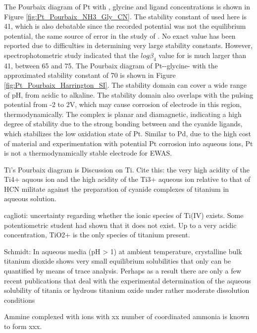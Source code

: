 \documentclass[journal=jacsat,manuscript=article]{achemso}
\begin{document}
The Pourbaix diagram of Pt with , glycine and  ligand concentrations is shown in Figure \ref{fig:Pt_Pourbaix_NH3_Gly_CN}. The stability constant of \ce{[Pt(CN)4^2+]} used here is 41\cite{Smith1989CriticalConstants}, which is also debatable since the recorded potential was not the equilibrium potential\cite{Hancock1976FormationTetrakiscyanopalladate2-}, the same source of error in the study of \ce{[Pd(CN)4^2+]}. No exact value has been reported due to difficulties in determining very large stability constants. However, spectrophotometric study indicated that the $log\beta_4$ value for \ce{[Pt(CN)4^2+]} is much larger than 41, between 65 and 75. The Pourbaix diagram of Pt--glycine- with the approximated \ce{[Pd(CN)4^2+]} stability constant of 70 is shown in Figure \ref{fig:Pt_Pourbaix_Harrington_SI}. The \ce{[Pt(CN)4^2+]} stability domain can cover a wide range of pH, from acidic to alkaline. The stability domain also overlaps with the pulsing potential from -2 to 2V, which may cause corrosion of electrode in this region, thermodynamically. The \ce{[Pd(CN)4^2+]} complex is planar and diamagnetic, indicating a high degree of stability due to the strong bonding between  and the cyanide ligands\cite{Griffith1962CyanideMetals}, which stabilizes the low oxidation state of Pt. Similar to Pd, due to the high cost of material and experimentation with potential Pt corrosion into aqueous ions, Pt is not a thermodynamically stable electrode for EWAS. 

Ti's Pourbaix diagram is 
Discussion on Ti. 
Cite this: the very high acidity of the Ti4+ aquous ion and the high acidity of the Ti3+ aqueous ion relative to that of HCN militate against the preparation of cyanide complexes of titanium in aqueous solution\cite{Nicholls1980ComplexTitanium}.

caglioti: uncertainty regarding whether the ionic species of Ti(IV) exists. Some potentiometric student had shown that it does not exist. Up to a very acidic concentration, TiO2+ is the only species of titanium present. 

Schmidt: In aqueous media (pH > 1) at ambient temperature, crystalline bulk titanium dioxide
shows very small equilibrium solubilities that only can be quantified by means of trace
analysis. Perhaps as a result there are only a few recent publications that deal with the experimental determination of the aqueous solubility of titania or hydrous titanium oxide under
rather moderate dissolution conditions

Ammine complexed with ions with xx number of coordinated ammonia is known to form xxx. 
\end{document}
